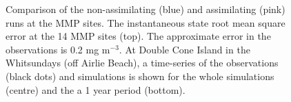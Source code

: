 \begin{figure}[thb]
\begin{center} 
\caption{Comparison of the non-assimilating (blue) and assimilating (pink) runs at the MMP
sites. The instantaneous state root mean square error at the 14 MMP sites (top). The approximate
error in the observations is 0.2 mg m$^{-3}$. At Double Cone Island in the Whitsundays (off Airlie
Beach), a time-series of the observations (black dots) and simulations is shown for the whole
simulations (centre) and the a 1 year period (bottom).}
\label{fig:RMSerror}
\end{center}
\end{figure}
